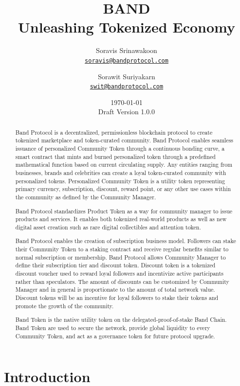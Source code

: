 \documentclass[letterpaper,11pt]{article}
\title{\LARGE BAND\\
    \Large Unleashing Tokenized Economy}
\author{
        Soravis Srinawakoon\\
        \small\href{mailto:soravis@bandprotocol.com}
            {\nolinkurl{soravis@bandprotocol.com}}
    \and
        Sorawit Suriyakarn\\
        \small\href{mailto:swit@bandprotocol.com}
            {\nolinkurl{swit@bandprotocol.com}}
    }
\date{\today\\\small Draft Version 1.0.0}
\begin{document}
\maketitle

\begin{abstract}

Band Protocol is a decentralized, permissionless blockchain protocol to create tokenized marketplace and token-curated community. Band Protocol enables seamless issuance of personalized Community Token through a continuous bonding curve, a smart contract that mints and burned personalized token through a predefined mathematical function based on current circulating supply. Any entities ranging from businesses, brands and celebrities can create a loyal token-curated community with personalized tokens. Personalized Community Token is a utility token representing primary currency, subscription, discount, reward point, or any other use cases within the community as defined by the Community Manager.

Band Protocol standardizes Product Token as a way for community manager to issue products and services. It enables both tokenized real-world products as well as new digital asset creation such as rare digital collectibles and attention token.

Band Protocol enables the creation of subscription business model. Followers can stake their Community Token to a staking contract and receive regular benefits similar to normal subscription or membership. Band Protocol allows Community Manager to define their subscription tier and discount token. Discount token is a tokenized discount voucher used to reward loyal followers and incentivize active participants rather than speculators. The amount of discounts can be customized by Community Manager and in general is proportionate to the amount of total network value. Discount tokens will be an incentive for loyal followers to stake their tokens and promote the growth of the community.

Band Token is the native utility token on the delegated-proof-of-stake Band Chain. Band Token are used to secure the network, provide global liquidity to every Community Token, and act as a governance token for future protocol upgrade.

\end{abstract}

\newpage
{
\hypersetup{linkcolor=black}
\tableofcontents
}
\newpage

\section{Introduction}
\end{document}
